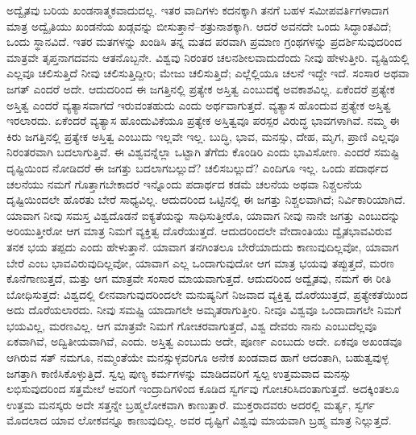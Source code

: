 ಅದ್ವೈತವು ಬರಿಯ ಖಂಡನಾತ್ಮಕವಾದುದಲ್ಲ. ಇತರ ವಾದಿಗಳು ಕದನಕ್ಕಾಗಿ ತನಗೆ ಬಹಳ ಸಮೀಪವರ್ತಿಗಳಾದಾಗ ಮಾತ್ರ ಅದ್ವೈತಿಯು ಖಂಡನೆಯ ಖಡ್ಗವನ್ನು ಬೀಸುತ್ತಾನೆ–ಶತ್ರುನಾಶಕ್ಕಾಗಿ. ಆದರೆ ಅವನದೇ ಒಂದು ಸಿದ್ಧಾಂತವಿದೆ; ಒಂದು ಸ್ಥಾನವಿದೆ. ಇತರ ಮತಗಳನ್ನು ಖಂಡಿಸಿ ತನ್ನ ಮತದ ಪರವಾಗಿ ಪ್ರಮಾಣ ಗ್ರಂಥಗಳನ್ನು ಪ್ರದರ್ಶಿಸುವುದರಿಂದ ಮಾತ್ರವೇ ತೃಪ್ತನಾಗದವನು ಆತನೊಬ್ಬನೇ. ವಿಶ್ವವು ನಿರಂತರ ಚಲನಶೀಲವಾದುದೆಂದು ನೀವು ಹೇಳುತ್ತೀರಿ. ವ್ಯಷ್ಟಿಯಲ್ಲಿ ಎಲ್ಲವೂ ಚಲಿಸುತ್ತಿದೆ ನೀವು ಚಲಿಸುತ್ತಿದ್ದೀರಿ; ಮೇಜು ಚಲಿಸುತ್ತಿದೆ; ಎಲ್ಲೆಲ್ಲಿಯೂ ಚಲನೆ ಇದ್ದೇ ಇದೆ. ಸಂಸಾರ ಅಥವಾ ಜಗತ್​ ಎಂದರೆ ಅದೇ. ಆದುದರಿಂದ ಈ ಜಗತ್ತಿನಲ್ಲಿ ಪ್ರತ್ಯೇಕ ಅಸ್ತಿತ್ವ  ಎಂಬುದಕ್ಕೆ ಅವಕಾಶವಿಲ್ಲ. ಏಕೆಂದರೆ ಪ್ರತ್ಯೇಕ ಅಸ್ತಿತ್ವ ಎಂದರೆ ವ್ಯತ್ಯಾಸವಾಗದೆ ಇರುವಂತಹುದು ಎಂದು ಅರ್ಥವಾಗುತ್ತದೆ. ವ್ಯತ್ಯಾಸ ಹೊಂದುವ ಪ್ರತ್ಯೇಕ ಅಸ್ತಿತ್ವ ಇರಲಾರದು. ಏಕೆಂದರೆ ವ್ಯತ್ಯಾಸ ಹೊಂದುವಿಕೆಯೂ ಪ್ರತ್ಯೇಕ ಅಸ್ತಿತ್ವವೂ ಪರಸ್ಪರ ವಿರುದ್ಧ ಭಾವಗಳಾಗಿವೆ. ನಮ್ಮ ಈ ಕಿರು ಜಗತ್ತಿನಲ್ಲಿ ಪ್ರತ್ಯೇಕ ಅಸ್ತಿತ್ವ ಎಂಬುದು ಇಲ್ಲವೇ ಇಲ್ಲ. ಬುದ್ಧಿ, ಭಾವ, ಮನಸ್ಸು, ದೇಹ, ಮೃಗ, ಪ್ರಾಣಿ ಎಲ್ಲವೂ ನಿರಂತರವಾಗಿ ಬದಲಾಗುತ್ತಿವೆ. ಈ ವಿಶ್ವವನ್ನೆಲ್ಲಾ ಒಟ್ಟಾಗಿ ತೆಗೆದು ಕೊಂಡಿರಿ ಎಂದು ಭಾವಿಸೋಣ. ಎಂದರೆ ಸಮಷ್ಟಿ ದೃಷ್ಟಿಯಿಂದ ನೋಡಿದರೆ ಈ ಜಗತ್ತು ಬದಲಾಗಬಲ್ಲುದೆ? ಚಲಿಸಬಲ್ಲುದೆ? ಎಂದಿಗೂ ಇಲ್ಲ. ಒಂದು ಪದಾರ್ಥದ ಚಲನೆಯು ನಮಗೆ ಗೊತ್ತಾಗಬೇಕಾದರೆ ಇನ್ನೊಂದು ಪದಾರ್ಥದ ಕಡಮೆ ಚಲನೆಯ ಅಥವಾ ನಿಶ್ಚಲನೆಯ ದೃಷ್ಟಿಯಿಂದಲೇ ಹೊರತು ಬೇರೆ ಸಾಧ್ಯವಿಲ್ಲ. ಆದುದರಿಂದ ಒಟ್ಟಿನಲ್ಲಿ ಈ ಜಗತ್ತು ನಿಶ್ಚಲವಾಗಿದೆ; ನಿರ್ವಿಕಾರಿಯಾಗಿದೆ. ಯಾವಾಗ ನೀವು ಸಮಸ್ತ ವಿಶ್ವದೊಡನೆ ಐಕ್ಯತೆಯನ್ನು ಸಾಧಿಸುತ್ತೀರೊ, ಯಾವಾಗ ನೀವು ನಾನೇ ಜಗತ್ತು ಎಂಬುದನ್ನು ಅರಿಯುತ್ತೀರೋ ಆಗ ಮಾತ್ರ ನಿಮಗೆ ವ್ಯಕ್ತಿತ್ವ ದೊರೆಯುತ್ತದೆ. ಆದುದರಿಂದಲೇ ವೇದಾಂತಿಯು ದ್ವೈತಭಾವವಿರುವ ತನಕ ಭಯ ತಪ್ಪದು ಎಂದು ಹೇಳುತ್ತಾನೆ. ಯಾವಾಗ ತನಗಿಂತಲೂ ಬೇರೆಯಾದುದು ಕಾಣುವುದಿಲ್ಲವೋ, ಯಾವಾಗ ಬೇರೆ ಎಂಬ ಭಾವವಿರುವುದಿಲ್ಲವೋ, ಯಾವಾಗ ಎಲ್ಲ ಒಂದಾಗುವುದೋ ಆಗ ಮಾತ್ರ ಭಯವು ತಪ್ಪುತ್ತದೆ, ಮರಣ ಕೊನೆಗಾಣುತ್ತದೆ, ಮತ್ತು ಆಗ ಮಾತ್ರವೇ ಸಂಸಾರ ಮಾಯವಾಗುತ್ತದೆ. ಆದುದರಿಂದ ಅದ್ವೈತವು, ನಮಗೆ ಈ ರೀತಿ ಬೋಧಿಸುತ್ತದೆ: ವಿಶ್ವದಲ್ಲಿ ಲೀನವಾಗುವುದರಿಂದಲೇ ಮನುಷ್ಯನಿಗೆ ನಿಜವಾದ ವ್ಯಕ್ತಿತ್ವ ದೊರೆಯುತ್ತದೆ, ಪ್ರತ್ಯೇಕತೆಯಿಂದ ಅದು ದೊರೆಯಲಾರದು. ನೀವು ಸಮಷ್ಟಿ ಯಾದಾಗಲೇ ಅಮೃತರಾಗುತ್ತೀರಿ. ನೀವೂ ವಿಶ್ವವೂ ಒಂದಾದಾಗಲೇ ನಿಮಗೆ ಭಯವಿಲ್ಲ, ಮರಣವಿಲ್ಲ. ಆಗ ಮಾತ್ರವೇ ನಿಮಗೆ ಗೋಚರವಾಗುತ್ತದೆ, ವಿಶ್ವ ದೇವರು ನಾನು ಎಂಬುದೆಲ್ಲವೂ ಏಕವಾಗಿವೆ, ಅದ್ವಿತೀಯವಾಗಿವೆ, ಎಂದು. ಅಸ್ತಿತ್ವ ಎಂಬುದು ಅದೇ, ಪೂರ್ಣ ಎಂಬುದು ಅದೇ. ಏಕವೂ ಅಖಂಡವೂ ಆಗಿರುವ ಸತ್​ ನಮಗೂ, ನಮ್ಮಂತೆಯೇ ಮನಸ್ಸುಳ್ಳವರಿಗೂ ಅನೇಕ ಖಂಡವಾದ ಹಾಗೆ ಆದಂತಾಗಿ, ಬಹುತ್ವವುಳ್ಳ ಜಗತ್ತಾಗಿ ಕಾಣಿಸಿಕೊಳ್ಳುತ್ತಿದೆ. ಸ್ವಲ್ಪ ಪುಣ್ಯ ಕರ್ಮಗಳನ್ನು ಮಾಡಿದವರಿಗೆ ಸ್ವಲ್ಪ ಉತ್ತಮವಾದ ಮನಸ್ಸು ಲಭಿಸುವುದರಿಂದ ಸತ್ತಮೇಲೆ ಅವರಿಗೆ ಇಂದ್ರಾದಿಗಳಿಂದ ಕೂಡಿದ ಸ್ವರ್ಗವು ಗೋಚರಿಸಿದಂತಾಗುತ್ತದೆ. ಅದಕ್ಕಿಂತಲೂ ಉತ್ತಮ ಮನಸ್ಕರು ಅದೇ ಸತ್ತನ್ನೇ ಬ್ರಹ್ಮಲೋಕವಾಗಿ ಕಾಣುತ್ತಾರೆ. ಮುಕ್ತರಾದವರು ಅದರಲ್ಲಿ ಮರ್ತ್ಯ, ಸ್ವರ್ಗ ಮೊದಲಾದ ಯಾವ ಲೋಕವನ್ನೂ ಕಾಣುವುದಿಲ್ಲ. ಅವರ ದೃಷ್ಟಿಗೆ ವಿಶ್ವವು ಮಾಯವಾಗಿ ಬ್ರಹ್ಮ ಮಾತ್ರ ನಿಲ್ಲುತ್ತದೆ. 

